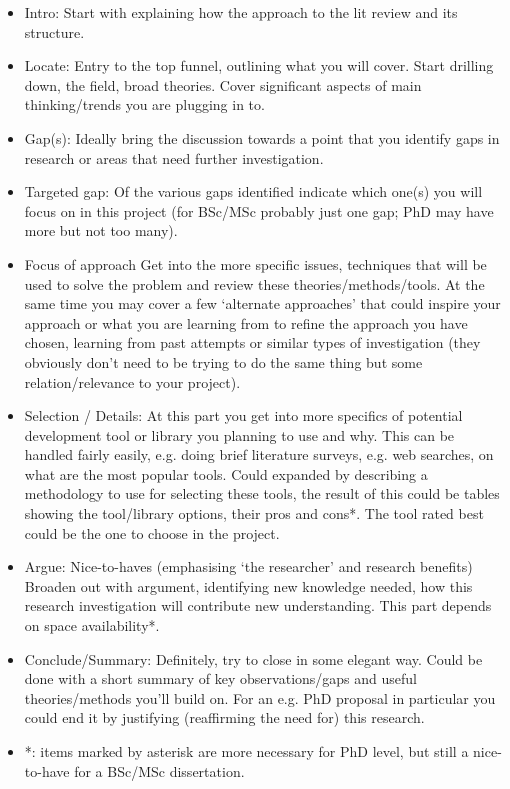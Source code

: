 \begin{itemize}
	\item Intro: Start with explaining how the approach to the lit review and its structure.
	\item Locate: Entry to the top funnel, outlining what you will cover. Start drilling down, the field, broad theories. Cover significant aspects of main thinking/trends you are plugging in to.
	\item Gap(s): Ideally bring the discussion towards a point that you identify gaps in research or areas that need further investigation.
	\item Targeted gap: Of the various gaps identified indicate which one(s) you will focus on 
	in this project (for BSc/MSc probably just one gap; PhD may have more but not too many).
	\item Focus of approach Get into the more specific issues, techniques that will be used to solve the problem and review these theories/methods/tools.
	At the same time you may cover a few ‘alternate approaches’ that could inspire your approach or what you are learning from to refine the approach you have chosen, learning from past attempts or similar types of investigation (they obviously don’t need to be trying to do the same thing but some relation/relevance to your project).
	\item Selection / Details: At this part you get into more specifics of potential development tool or library you planning to use and why.
	This can be handled fairly easily, e.g. doing brief literature surveys, e.g. web searches, on what are the most popular tools. Could expanded by describing a methodology to use for selecting these tools, the result of this could be tables showing the tool/library options, their pros and cons*. The tool rated best could be the one to choose in the project.
	\item Argue: Nice-to-haves (emphasising ‘the researcher’ and research benefits) Broaden out with argument, identifying new knowledge needed, how this research investigation will contribute new understanding. This part depends on space availability*.
	\item Conclude/Summary: Definitely, try to close in some elegant way. Could be done with a short summary of key observations/gaps and useful theories/methods you’ll build on. For an e.g. PhD proposal in particular you could end it by justifying (reaffirming the need for) this research.
	\item *: items marked by asterisk are more necessary for PhD level, but still a nice-to-have for a BSc/MSc dissertation.
\end{itemize}

